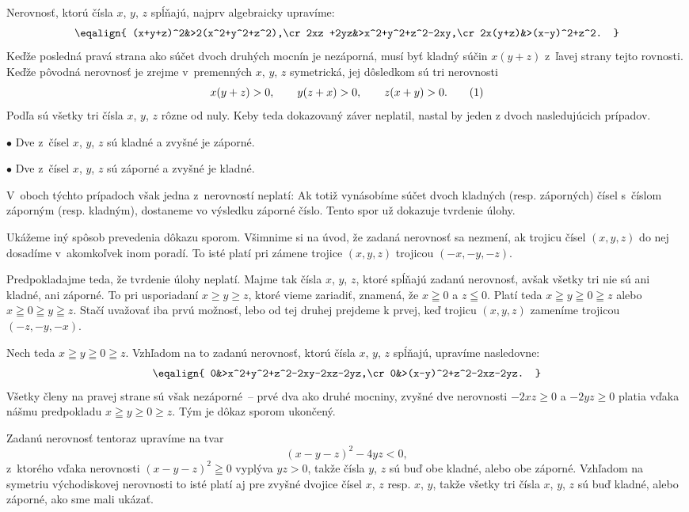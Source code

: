 {%
Nerovnosť, ktorú čísla $x$, $y$, $z$ spĺňajú, najprv algebraicky
upravíme:
$$\eqalign{
(x+y+z)^2&>2(x^2+y^2+z^2),\cr
2xz +2yz&>x^2+y^2+z^2-2xy,\cr
2x(y+z)&>(x-y)^2+z^2.
    }$$
Keďže posledná pravá strana ako súčet dvoch druhých mocnín je
nezáporná, musí byť kladný súčin $x(y+z)$ z~ľavej strany tejto rovnosti.
Keďže pôvodná nerovnosť je zrejme v~premenných $x$, $y$, $z$
symetrická, jej dôsledkom sú tri nerovnosti
$$
x(y+z)>0,\qquad y(z+x)>0,\qquad z(x+y)>0.
\tag1
$$
Podľa  sú všetky tri čísla $x$, $y$, $z$ rôzne od nuly.
Keby teda dokazovaný záver neplatil, nastal by jeden z dvoch
nasledujúcich prípadov.

\smallskip
\item{$\bullet$} Dve z~čísel $x$, $y$, $z$ sú kladné a zvyšné je záporné.
\item{$\bullet$} Dve z~čísel $x$, $y$, $z$ sú záporné a zvyšné je kladné.

\smallskip\noindent
V~oboch týchto prípadoch však jedna z~nerovností  neplatí:
Ak totiž vynásobíme súčet dvoch kladných (resp. záporných) čísel
s~číslom záporným (resp. kladným), dostaneme vo výsledku záporné
číslo. Tento spor už dokazuje tvrdenie úlohy.

\ineriesenie
Ukážeme iný spôsob prevedenia dôkazu sporom. Všimnime si
na úvod, že zadaná nerovnosť sa nezmení, ak trojicu čísel $(x,y,z)$
do nej dosadíme v~akomkoľvek inom poradí. To isté platí
pri zámene trojice $(x,y,z)$ trojicou $({-x},{-y},{-z})$.

Predpokladajme teda, že tvrdenie úlohy neplatí. Majme tak čísla
$x$, $y$, $z$, ktoré spĺňajú zadanú nerovnosť, avšak všetky tri
nie sú ani kladné, ani záporné. To pri usporiadaní $x\geq y\geq z$,
ktoré vieme zariadiť, znamená, že $x\geqq0$ a $z\leqq0$. Platí teda
$x\geqq y\geqq0\geqq z$ alebo $x\geqq 0\geqq y\geqq z$. Stačí
uvažovať iba prvú možnosť, lebo od tej druhej prejdeme k prvej,
keď trojicu $(x,y,z)$ zameníme trojicou $({-z},{-y},{-x})$.

Nech teda $x\geqq y\geqq0\geqq z$. Vzhľadom na to zadanú
nerovnosť, ktorú čísla $x$, $y$, $z$ spĺňajú, upravíme
nasledovne:
$$\eqalign{
0&>x^2+y^2+z^2-2xy-2xz-2yz,\cr
0&>(x-y)^2+z^2-2xz-2yz.
    }$$
Všetky členy na pravej strane sú však nezáporné~-- prvé
dva ako druhé mocniny, zvyšné dve nerovnosti ${-2xz}\geq0$ a
${-2yz}\geq0$ platia vďaka nášmu predpokladu $x\geqq y\geq0\geq z$.
Tým je dôkaz sporom ukončený.

\ineriesenie
Zadanú nerovnosť tentoraz upravíme na tvar
$$
(x-y-z)^2-4yz<0,
$$
z~ktorého vďaka nerovnosti $(x-y-z)^2\geqq0$ vyplýva $yz>0$,
takže čísla $y$, $z$ sú buď obe kladné, alebo obe záporné.
Vzhľadom na symetriu východiskovej nerovnosti
to isté platí aj pre zvyšné dvojice čísel $x$, $z$ resp. $x$, $y$,
takže všetky tri čísla $x$, $y$, $z$ sú buď kladné, alebo záporné,
ako sme mali ukázať.

}

